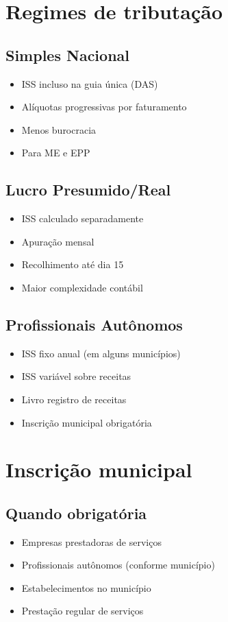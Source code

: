 \documentclass[12pt,a4paper]{article}
\begin{document}
\section{Regimes de tributação}

\subsection{Simples Nacional}
\begin{itemize}
    \item ISS incluso na guia única (DAS)
    \item Alíquotas progressivas por faturamento
    \item Menos burocracia
    \item Para ME e EPP
\end{itemize}

\subsection{Lucro Presumido/Real}
\begin{itemize}
    \item ISS calculado separadamente
    \item Apuração mensal
    \item Recolhimento até dia 15
    \item Maior complexidade contábil
\end{itemize}

\subsection{Profissionais Autônomos}
\begin{itemize}
    \item ISS fixo anual (em alguns municípios)
    \item ISS variável sobre receitas
    \item Livro registro de receitas
    \item Inscrição municipal obrigatória
\end{itemize}

\section{Inscrição municipal}

\subsection{Quando obrigatória}
\begin{itemize}
    \item Empresas prestadoras de serviços
    \item Profissionais autônomos (conforme município)
    \item Estabelecimentos no município
    \item Prestação regular de serviços
\end{itemize}
\end{document}
